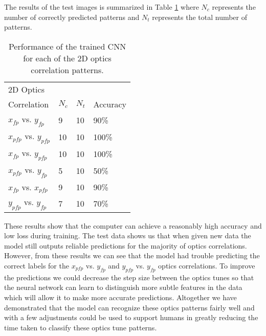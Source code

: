 \documentclass[conference]{IEEEtran}
\begin{document}
The results of the test images is summarized in Table  \ref{tab:results} where $N_{c}$ represents the number of correctly predicted patterns and $N_{t}$ represents the total number of patterns.
\begin{table}[h]
	\begin{center}
		\begin{tabular}{ p{2cm}p{1cm}p{1cm}p{1cm}  } %
                  \hline
                  2D Optics \\Correlation  & $N_{c}$  & $N_{t}$ & Accuracy \\ \hline \hline
	          $x_{fp}$ vs. $y_{fp}$ & 9 & 10 &  90\% \\
                   $x_{pfp}$ vs. $y_{pfp}$ & 10 & 10 & 100\%\\
                   $x_{fp}$ vs. $y_{pfp}$ & 10 & 10 & 100\%\\
                   $x_{pfp}$ vs. $y_{fp}$ & 5 & 10 & 50\%\\
                   $x_{fp}$ vs. $x_{pfp}$ & 9 & 10 & 90\%\\
                   $y_{pfp}$ vs. $y_{fp}$ & 7 & 10 & 70\%\\

                  

    
		  \hline 
		\end{tabular}
	\end{center}
	\caption{Performance of the trained CNN for each of the 2D optics correlation patterns.}
	\label{tab:results}
\end{table}




These results show that the computer can achieve a reasonably high accuracy and low loss during training. The test data shows us that when given new data the model still outputs reliable predictions for the majority of optics correlations. However, from these results we can see that the model had trouble predicting the correct labels for the $x_{pfp}$ vs. $y_{fp}$ and  $y_{pfp}$ vs. $y_{fp}$  optics correlations. To improve the predictions we could decrease the step size between the optics tunes so that the neural network can learn to distinguish more subtle features in the data which will allow it to make more accurate predictions. Altogether we have demonstrated that the model can recognize these optics patterns fairly well and with a few adjustments could be used to support humans in greatly reducing the time taken to classify these optics tune patterns.









   

\end{document}
